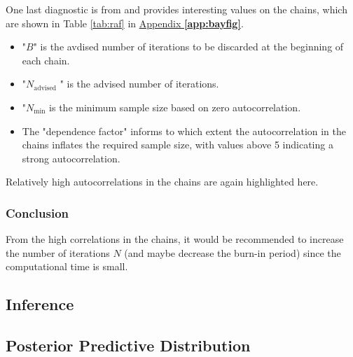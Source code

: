 One last diagnostic is from \citet{raftery1992} and provides interesting values on the chains, which are shown in Table \ref{tab:raf} in \hyperref[app:bayfig]{Appendix \textbf{\ref{app:bayfig}}}.

\begin{itemize} 
\item "$B$" is the avdised number of iterations to be discarded at the beginning of each chain.
\item "$N_{\text{advised}}$ " is the advised number of iterations.
\item "$N_{\text{min}}$ is the minimum sample size based on zero autocorrelation.
\item The "dependence factor" informs to which extent the autocorrelation in the chains inflates the required sample size, with values above 5 indicating a strong autocorrelation. 
\end{itemize}
Relatively high autocorrelations in the chains are again highlighted here.


\subsubsection*{Conclusion}

From the high correlations in the chains, it would be recommended to increase the number of iterations $N$ (and maybe decrease the burn-in period) since the computational time is small. 


\subsection{Inference}


\subsection{Posterior Predictive Distribution} 

